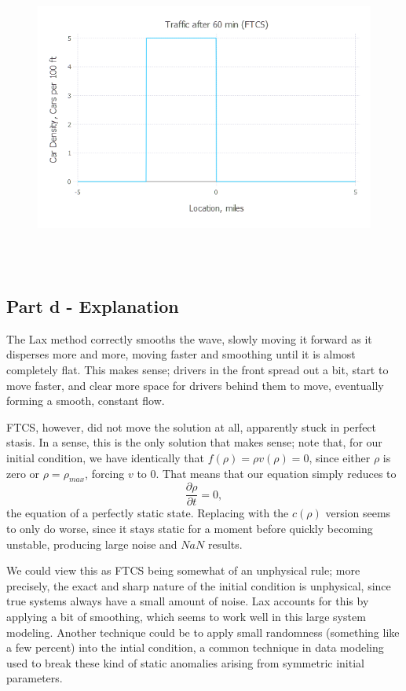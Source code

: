 \documentclass{article}
\begin{document}
\begin{figure}[H]
	\includegraphics[width=6in,height=4in]{"Traffic after 60 min (FTCS)"}
\end{figure}

\subsection{Part d - Explanation}
The Lax method correctly smooths the wave, slowly moving it forward as it disperses more and more, moving faster and smoothing until it is almost completely flat. This makes sense; drivers in the front spread out a bit, start to move faster, and clear more space for drivers behind them to move, eventually forming a smooth, constant flow.

FTCS, however, did not move the solution at all, apparently stuck in perfect stasis. In a sense, this is the only solution that makes sense; note that, for our initial condition, we have identically that $f(\rho) = \rho v(\rho) = 0$, since either $\rho$ is zero or $\rho=\rho_{max}$, forcing $v$ to 0. That means that our equation simply reduces to
$$\frac{\partial \rho}{\partial t} = 0,$$
the equation of a perfectly static state. Replacing with the $c(\rho)$ version seems to only do worse, since it stays static for a moment before quickly becoming unstable, producing large noise and $NaN$ results.

We could view this as FTCS being somewhat of an unphysical rule; more precisely, the exact and sharp nature of the initial condition is unphysical, since true systems always have a small amount of noise. Lax accounts for this by applying a bit of smoothing, which seems to work well in this large system modeling. Another technique could be to apply small randomness (something like a few percent) into the intial condition, a common technique in data modeling used to break these kind of static anomalies arising from symmetric initial parameters.
\end{document}
